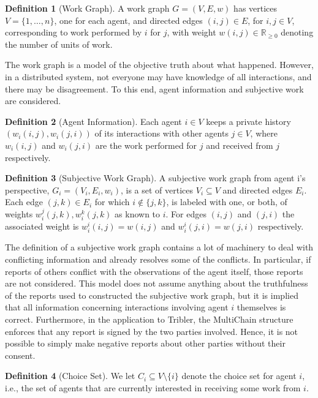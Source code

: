 \documentclass[a4paper,11pt]{book}
\newcommand{\bb}{\mathbb}
\theoremstyle{definition}
\newtheorem{definition}{Definition}
\begin{document}
\begin{definition}[Work Graph]
    A work graph $G = (V, E, w)$ has vertices $V = \{1, \ldots, n\}$, one for each agent, and directed
    edges $(i, j) \in E$, for $i, j \in V$, corresponding to work performed by $i$ for $j$, with weight
    $w(i,j) \in \bb{R}_{\geq0}$ denoting the number of units of work.
    \label{def:work_graph}
\end{definition}

The work graph is a model of the objective truth about what happened. However, in a distributed system,
not everyone may have knowledge of all interactions, and there may be disagreement. To this end, agent
information and subjective work are considered.

\begin{definition}[Agent Information]
   Each agent $i \in V$ keeps a private history $(w_i(i,j), w_i(j, i))$ of its interactions with
   other agents $j \in V$, where $w_i(i,j)$ and $w_i(j,i)$ are the work performed for $j$ and
   received from $j$ respectively.
\end{definition}

\begin{definition}[Subjective Work Graph]
   A subjective work graph from agent i's perspective, $G_i = (V_i, E_i, w_i)$, is a set of vertices
   $V_i \subseteq V$ and directed edges $E_i$. Each edge $(j, k) \in E_i$ for which $i \notin \{j, k\}$,
   is labeled with one, or both, of weights $w^j_i(j, k), w_i^k(j, k)$ as known to $i$. For edges $(i,j)$
   and $(j,i)$ the associated weight is $w_i^i(i,j) = w(i,j)$ and $w_i^i(j, i) = w(j,i)$ respectively.
\end{definition}

The definition of a subjective work graph contains a lot of machinery to deal with conflicting information
and already resolves some of the conflicts. In particular, if reports of others conflict with the observations
of the agent itself, those reports are not considered. This model does not assume anything about the truthfulness
of the reports used to constructed the subjective work graph, but it is implied that all information concerning
interactions involving agent $i$ themselves is correct. Furthermore, in the application to Tribler, the
MultiChain structure enforces that any report is signed by the two parties involved. Hence, it is not possible
to simply make negative reports about other parties without their consent. 

\begin{definition}[Choice Set]
    We let $C_i \subseteq V \setminus \{i\}$ denote the choice set for agent $i$, i.e., the set of agents that
    are currently interested in receiving some work from $i$.
    \label{def:choice_set}
\end{definition}
\end{document}
